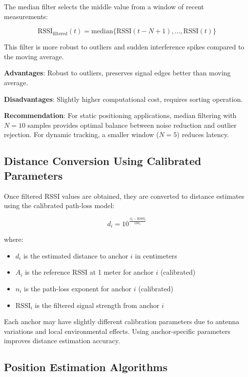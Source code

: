 The median filter selects the middle value from a window of recent measurements:

\begin{equation}
\text{RSSI}_{\text{filtered}}(t) = \text{median}\{\text{RSSI}(t-N+1), \ldots, \text{RSSI}(t)\}
\end{equation}

This filter is more robust to outliers and sudden interference spikes compared to the moving average.

\textbf{Advantages}: Robust to outliers, preserves signal edges better than moving average.

\textbf{Disadvantages}: Slightly higher computational cost, requires sorting operation.

\textbf{Recommendation}: For static positioning applications, median filtering with $N=10$ samples provides optimal balance between noise reduction and outlier rejection. For dynamic tracking, a smaller window ($N=5$) reduces latency.

\subsection{Distance Conversion Using Calibrated Parameters}

Once filtered RSSI values are obtained, they are converted to distance estimates using the calibrated path-loss model:

\begin{equation}
d_i = 10^{\frac{A_i - \text{RSSI}_i}{10n_i}}
\end{equation}

where:
\begin{itemize}
    \item $d_i$ is the estimated distance to anchor $i$ in centimeters
    \item $A_i$ is the reference RSSI at 1 meter for anchor $i$ (calibrated)
    \item $n_i$ is the path-loss exponent for anchor $i$ (calibrated)
    \item $\text{RSSI}_i$ is the filtered signal strength from anchor $i$
\end{itemize}

Each anchor may have slightly different calibration parameters due to antenna variations and local environmental effects. Using anchor-specific parameters improves distance estimation accuracy.

\subsection{Position Estimation Algorithms}

